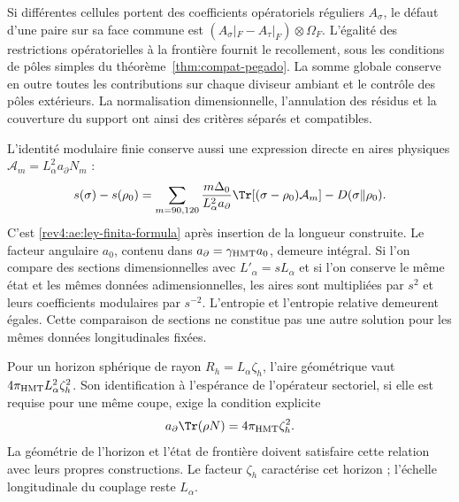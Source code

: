 Si différentes cellules portent des coefficients opératoriels réguliers \(A_\sigma\), le défaut d'une paire sur sa face commune est \((A_\sigma|_F-A_\tau|_F)\otimes\Omega_F\). L'égalité des restrictions opératorielles à la frontière fournit le recollement, sous les conditions de pôles simples du théorème~\ref{thm:compat-pegado}. La somme globale conserve en outre toutes les contributions sur chaque diviseur ambiant et le contrôle des pôles extérieurs. La normalisation dimensionnelle, l'annulation des résidus et la couverture du support ont ainsi des critères séparés et compatibles.

L’identité modulaire finie conserve aussi une expression directe
en aires physiques \(\mathcal A_m=L_\alpha^2a_\partial N_m\) :
\begin{equation}
 s(\sigma)-s(\rho_0)
 =\sum_{m=90,120}\frac{m\Delta_0}{L_\alpha^2a_\partial}
   \Tr[(\sigma-\rho_0)\mathcal A_m]
  -D(\sigma\Vert\rho_0).
 \label{rev5:modular-fisica}
\end{equation}
C’est \eqref{rev4:ae:ley-finita-formula} après insertion de la
longueur construite. Le facteur angulaire \(a_0\), contenu dans
\(a_\partial=\gamma_{\rm HMT}a_0\), demeure intégral.
Si l’on compare des sections dimensionnelles avec \(L'_\alpha=sL_\alpha\)
et si l’on conserve le même état et les mêmes données adimensionnelles,
les aires sont multipliées par \(s^2\) et leurs coefficients modulaires
par \(s^{-2}\). L’entropie et l’entropie relative demeurent
égales. Cette comparaison de sections ne constitue pas une autre solution
pour les mêmes données longitudinales fixées.

Pour un horizon sphérique de rayon \(R_h=L_\alpha\zeta_h\),
l’aire géométrique vaut \(4\pi_{\rm HMT}L_\alpha^2\zeta_h^2\).
Son identification à l’espérance de l’opérateur sectoriel, si elle est
requise pour une même coupe, exige la condition explicite
\[
 a_\partial\Tr(\rho N)=4\pi_{\rm HMT}\zeta_h^2.
\]
La géométrie de l'horizon et l'état de frontière doivent satisfaire cette relation avec leurs propres constructions. Le facteur \(\zeta_h\) caractérise cet horizon ; l'échelle longitudinale du couplage reste \(L_\alpha\).
